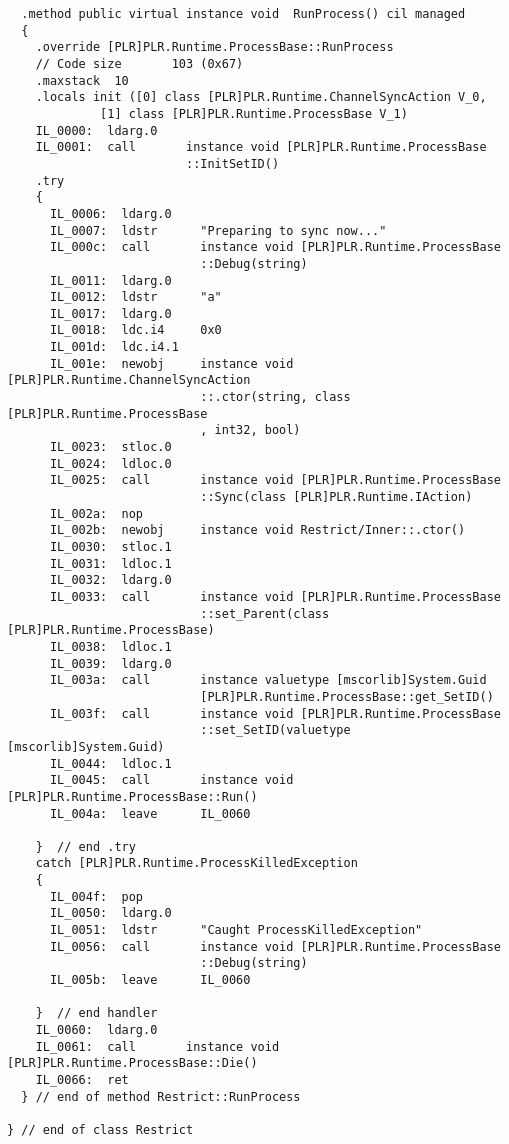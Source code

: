 \begin{lstlisting}
  .method public virtual instance void  RunProcess() cil managed
  {
    .override [PLR]PLR.Runtime.ProcessBase::RunProcess
    // Code size       103 (0x67)
    .maxstack  10
    .locals init ([0] class [PLR]PLR.Runtime.ChannelSyncAction V_0,
             [1] class [PLR]PLR.Runtime.ProcessBase V_1)
    IL_0000:  ldarg.0
    IL_0001:  call       instance void [PLR]PLR.Runtime.ProcessBase
                         ::InitSetID()
    .try
    {
      IL_0006:  ldarg.0
      IL_0007:  ldstr      "Preparing to sync now..."
      IL_000c:  call       instance void [PLR]PLR.Runtime.ProcessBase
                           ::Debug(string)
      IL_0011:  ldarg.0
      IL_0012:  ldstr      "a"
      IL_0017:  ldarg.0
      IL_0018:  ldc.i4     0x0
      IL_001d:  ldc.i4.1
      IL_001e:  newobj     instance void [PLR]PLR.Runtime.ChannelSyncAction
                           ::.ctor(string, class [PLR]PLR.Runtime.ProcessBase
                           , int32, bool)
      IL_0023:  stloc.0
      IL_0024:  ldloc.0
      IL_0025:  call       instance void [PLR]PLR.Runtime.ProcessBase
                           ::Sync(class [PLR]PLR.Runtime.IAction)
      IL_002a:  nop
      IL_002b:  newobj     instance void Restrict/Inner::.ctor()
      IL_0030:  stloc.1
      IL_0031:  ldloc.1
      IL_0032:  ldarg.0
      IL_0033:  call       instance void [PLR]PLR.Runtime.ProcessBase
                           ::set_Parent(class [PLR]PLR.Runtime.ProcessBase)
      IL_0038:  ldloc.1
      IL_0039:  ldarg.0
      IL_003a:  call       instance valuetype [mscorlib]System.Guid 
                           [PLR]PLR.Runtime.ProcessBase::get_SetID()
      IL_003f:  call       instance void [PLR]PLR.Runtime.ProcessBase
                           ::set_SetID(valuetype [mscorlib]System.Guid)
      IL_0044:  ldloc.1
      IL_0045:  call       instance void [PLR]PLR.Runtime.ProcessBase::Run()
      IL_004a:  leave      IL_0060

    }  // end .try
    catch [PLR]PLR.Runtime.ProcessKilledException 
    {
      IL_004f:  pop
      IL_0050:  ldarg.0
      IL_0051:  ldstr      "Caught ProcessKilledException"
      IL_0056:  call       instance void [PLR]PLR.Runtime.ProcessBase
                           ::Debug(string)
      IL_005b:  leave      IL_0060

    }  // end handler
    IL_0060:  ldarg.0
    IL_0061:  call       instance void [PLR]PLR.Runtime.ProcessBase::Die()
    IL_0066:  ret
  } // end of method Restrict::RunProcess

} // end of class Restrict

\end{lstlisting}

